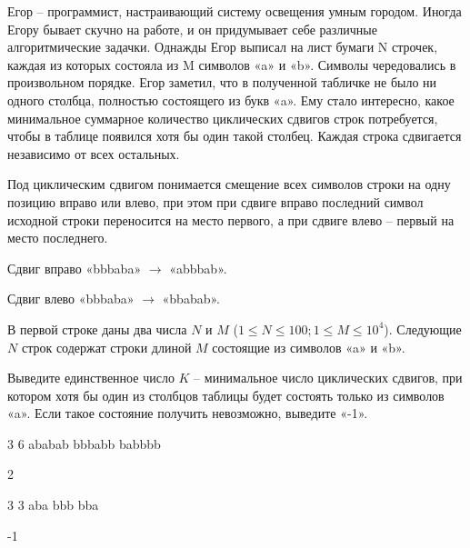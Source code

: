 
Егор – программист, настраивающий систему освещения умным городом. Иногда Егору бывает скучно на работе, и он придумывает себе различные алгоритмические задачки. Однажды Егор выписал на лист бумаги N строчек, каждая из которых состояла из M символов «a» и «b». Символы чередовались в произвольном порядке. Егор заметил, что в полученной табличке не было ни одного столбца, полностью состоящего из букв «a». Ему стало интересно, какое минимальное суммарное количество циклических сдвигов строк потребуется, чтобы в таблице появился хотя бы один такой столбец. Каждая строка сдвигается независимо от всех остальных.

Под циклическим сдвигом понимается смещение всех символов строки на одну позицию вправо или влево, при этом при сдвиге вправо последний символ исходной строки переносится на место первого, а при сдвиге влево – первый на место последнего.

Сдвиг вправо «bbbaba» $ \rightarrow $ «abbbab».

Сдвиг влево «bbbaba» $ \rightarrow $ «bbabab».


В первой строке
даны два числа $ N $ и $ M $
($ 1 \le N \le 100; 1 \le M \le 10^4 $). Следующие
$ N $ строк
содержат строки длиной $ M $ состоящие из символов «a» и «b».

\outputfmtSection

Выведите
единственное число $ K $ – минимальное число циклических сдвигов, при котором хотя бы
один из столбцов таблицы будет состоять только из символов «a». Если такое состояние получить невозможно,
выведите «-1».

\begin{myverbbox}[\small]{\vinput}
    3 6
    ababab
    bbbabb
    babbbb
\end{myverbbox}
\begin{myverbbox}[\small]{\voutput}
    2
\end{myverbbox}

\begin{myverbbox}[\small]{\vinput}
    3 3
    aba
    bbb
    bba
\end{myverbbox}
\begin{myverbbox}[\small]{\voutput}
    -1
\end{myverbbox}

